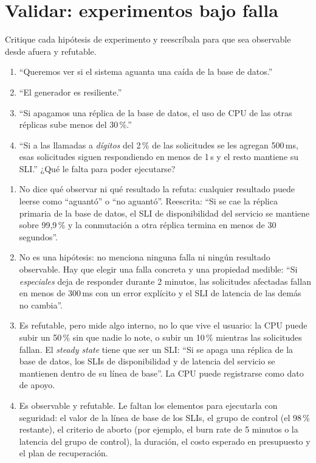 \documentclass[variant=guia,cover=institutional,mode=screen]{ua-engineering-v6-article}
\begin{document}
\section{Validar: experimentos bajo falla}
\begin{uaexercise}
Critique cada hipótesis de experimento y reescríbala para que sea observable desde afuera y refutable.
\begin{enumerate}
\item ``Queremos ver si el sistema aguanta una caída de la base de datos.''
\item ``El generador es resiliente.''
\item ``Si apagamos una réplica de la base de datos, el uso de CPU de las otras réplicas sube menos del 30\,\%.''
\item ``Si a las llamadas a \emph{dígitos} del 2\,\% de las solicitudes se les agregan 500\,ms, esas solicitudes siguen respondiendo en menos de 1\,s y el resto mantiene su SLI.'' ¿Qué le falta para poder ejecutarse?
\end{enumerate}
\end{uaexercise}
\begin{uaanswer}
\begin{enumerate}
\item No dice qué observar ni qué resultado la refuta: cualquier resultado puede leerse como ``aguantó'' o ``no aguantó''. Reescrita: ``Si se cae la réplica primaria de la base de datos, el SLI de disponibilidad del servicio se mantiene sobre 99,9\,\% y la conmutación a otra réplica termina en menos de 30 segundos''.
\item No es una hipótesis: no menciona ninguna falla ni ningún resultado observable. Hay que elegir una falla concreta y una propiedad medible: ``Si \emph{especiales} deja de responder durante 2 minutos, las solicitudes afectadas fallan en menos de 300\,ms con un error explícito y el SLI de latencia de las demás no cambia''.
\item Es refutable, pero mide algo interno, no lo que vive el usuario: la CPU puede subir un 50\,\% sin que nadie lo note, o subir un 10\,\% mientras las solicitudes fallan. El \emph{steady state} tiene que ser un SLI: ``Si se apaga una réplica de la base de datos, los SLIs de disponibilidad y de latencia del servicio se mantienen dentro de su línea de base''. La CPU puede registrarse como dato de apoyo.
\item Es observable y refutable. Le faltan los elementos para ejecutarla con seguridad: el valor de la línea de base de los SLIs, el grupo de control (el 98\,\% restante), el criterio de aborto (por ejemplo, el burn rate de 5 minutos o la latencia del grupo de control), la duración, el costo esperado en presupuesto y el plan de recuperación.
\end{enumerate}
\end{uaanswer}
\end{document}
